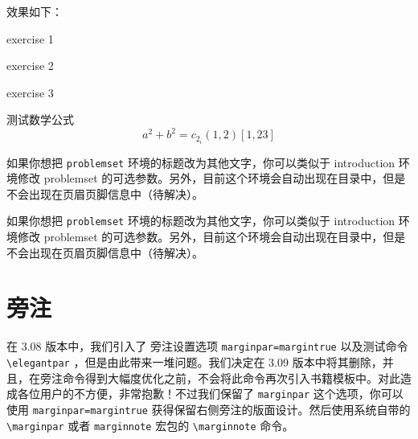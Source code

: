 \documentclass[lang=cn,10pt,cite=super]{elegantbook}
\begin{document}
效果如下：
\begin{problemset}
  \item exercise 1
  \item exercise 2
  \item exercise 3
  \item 测试数学公式
  \begin{equation}
    a^2+b^2=c_{2_{i}} (1,2) [1,23]
  \end{equation}
\end{problemset}

\begin{remark}
如果你想把 \lstinline{problemset} 环境的标题改为其他文字，你可以类似于 introduction 环境修改 problemset 的可选参数。另外，目前这个环境会自动出现在目录中，但是不会出现在页眉页脚信息中（待解决）。
\end{remark}

\begin{solution}
如果你想把 \lstinline{problemset} 环境的标题改为其他文字，你可以类似于 introduction 环境修改 problemset 的可选参数。另外，目前这个环境会自动出现在目录中，但是不会出现在页眉页脚信息中（待解决）。
\end{solution}

\section{旁注}

在 3.08 版本中，我们引入了 旁注设置选项 \lstinline{marginpar=margintrue} 以及测试命令 \lstinline{\elegantpar} ，但是由此带来一堆问题。我们决定在 3.09 版本中将其删除，并且，在旁注命令得到大幅度优化之前，不会将此命令再次引入书籍模板中。对此造成各位用户的不方便，非常抱歉！不过我们保留了 \lstinline{marginpar} 这个选项，你可以使用 \lstinline{marginpar=margintrue} 获得保留右侧旁注的版面设计。然后使用系统自带的 \lstinline{\marginpar} 或者 \lstinline{marginnote} 宏包的 \lstinline{\marginnote} 命令。
\end{document}
